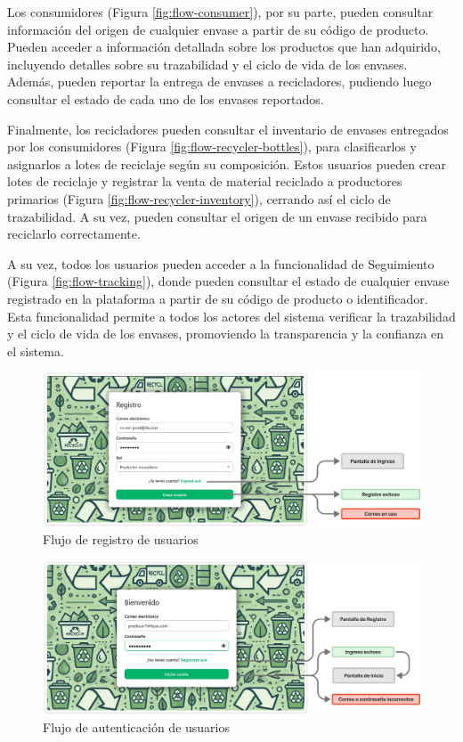 Los consumidores (Figura \ref{fig:flow-consumer}), por su parte, pueden consultar información del origen de cualquier envase a partir de su código de producto. Pueden acceder a información detallada sobre los productos que han adquirido, incluyendo detalles sobre su trazabilidad y el ciclo de vida de los envases. Además, pueden reportar la entrega de envases a recicladores, pudiendo luego consultar el estado de cada uno de los envases reportados.

Finalmente, los recicladores pueden consultar el inventario de envases entregados por los consumidores (Figura \ref{fig:flow-recycler-bottles}), para clasificarlos y asignarlos a lotes de reciclaje según su composición. Estos usuarios pueden crear lotes de reciclaje y registrar la venta de material reciclado a productores primarios (Figura \ref{fig:flow-recycler-inventory}), cerrando así el ciclo de trazabilidad. A su vez, pueden consultar el origen de un envase recibido para reciclarlo correctamente.

A su vez, todos los usuarios pueden acceder a la funcionalidad de Seguimiento (Figura \ref{fig:flow-tracking}), donde pueden consultar el estado de cualquier envase registrado en la plataforma a partir de su código de producto o identificador. Esta funcionalidad permite a todos los actores del sistema verificar la trazabilidad y el ciclo de vida de los envases, promoviendo la transparencia y la confianza en el sistema.

\begin{figure}[!htb]
	\centering
	\includegraphics[width=\linewidth]{Figures/flow-register.png}
	\caption{Flujo de registro de usuarios}
  \label{fig:flow-register}
\end{figure}

\begin{figure}[!htb]
	\centering
	\includegraphics[width=\linewidth]{Figures/flow-login.png}
	\caption{Flujo de autenticación de usuarios}
	\label{fig:flow-auth}
\end{figure}

